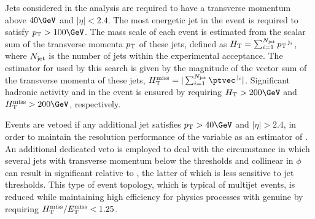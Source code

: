 Jets considered in the analysis are required to have a transverse
momentum above $40\GeV$ and $|\eta| < 2.4$. The most energetic jet in
the event is required to satisfy $\Pt > 100\GeV$. The mass scale of
each event is estimated from the scalar sum of the transverse momenta
${p_{\text T}}$ of these jets, defined as $H_{\mathrm{T}} = \sum_{i=1}^{N_{\rm jet}}
{p_{\text T}}^{\,\mathrm{j}_i}$, where $N_{\rm jet}$ is the number of jets
within the experimental acceptance. The estimator for \met used by
this search is given by the magnitude of the vector sum of the
transverse momenta of these jets, $\mht = |\sum_{i=1}^{N_\text{jet}}
\ptvec^{\,\mathrm{j}_i}|$. Significant hadronic activity and
\ptvecmiss in the event is ensured by requiring $\scalht > 200\GeV$
and $\mht > 200\GeV$, respectively.

Events are vetoed if any additional jet satisfies $\Pt > 40\GeV$ and
$|\eta| > 2.4$, in order to maintain the resolution performance of the
variable \mht as an estimator of \met. An additional dedicated veto is
employed to deal with the circumstance in which several jets with
transverse momentum below the \Pt thresholds and collinear in $\phi$
can result in significant \mht relative to \met, the latter of which
is less sensitive to jet thresholds. This type of event topology,
which is typical of multijet events, is reduced while maintaining high
efficiency for physics processes with genuine \ptvecmiss by requiring
$H_{\mathrm{T}}^{\text{miss}} / E_{\mathrm{T}}^{\text{miss}} < 1.25$.

